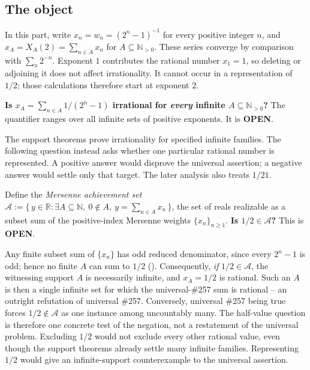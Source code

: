 \subsection{The object}

In this part, write $x_n=w_n=(2^n-1)^{-1}$ for every positive
integer $n$, and $x_A=X_A(2)=\sum_{n\in A}x_n$ for
$A\subseteq\mathbb N_{>0}$.  These series converge by comparison
with $\sum_n2^{-n}$.  Exponent $1$ contributes the rational number
$x_1=1$, so deleting or adjoining it does not affect irrationality.
It cannot occur in a representation of $1/2$; those calculations
therefore start at exponent $2$.

\begin{defn}
\textbf{Is $x_A = \sum_{n \in A} 1/(2^n-1)$ irrational for \emph{every} infinite
$A \subseteq \mathbb{N}_{>0}$?}
The quantifier ranges over all infinite sets of positive exponents. It is
\textbf{OPEN}.
\end{defn}

The support theorems prove irrationality for specified infinite
families.  The following question instead asks whether one particular
rational number is represented.  A positive answer would disprove
the universal assertion; a negative answer would settle only that
target.  The later analysis also treats $1/21$.

\begin{defn}
\label{defn:half-question}
Define the \emph{Mersenne achievement set}
$\mathcal{A} := \{\,y \in \mathbb{R} : \exists A \subseteq \mathbb{N},\ 0 \notin A,\ y =
\sum_{n \in A} x_n\,\}$, the set of reals realizable as a subset sum of the positive-index Mersenne
weights $\{x_n\}_{n \ge 1}$. \textbf{Is $1/2 \in \mathcal{A}$?} This is \textbf{OPEN}.
\end{defn}

\begin{obs}
\label{obs:half-controls-universal}
Any finite subset sum of $\{x_n\}$ has odd reduced denominator, since every $2^n - 1$ is odd; hence
no finite $A$ can sum to $1/2$ ().
Consequently, \emph{if} $1/2 \in \mathcal{A}$, the witnessing support $A$ is necessarily infinite, and
$x_A = 1/2$ is rational. Such an $A$ is then a single infinite set for which the universal-\#257
sum is rational -- an outright refutation of universal \#257. Conversely, universal \#257 being true
forces $1/2 \notin \mathcal{A}$ as one instance among uncountably many. The half-value question is therefore one concrete test of the negation,
not a restatement of the universal problem.  Excluding $1/2$ would
not exclude every other rational value, even though the support
theorems already settle many infinite families.  Representing $1/2$
would give an infinite-support counterexample to the universal
assertion.
\end{obs}

